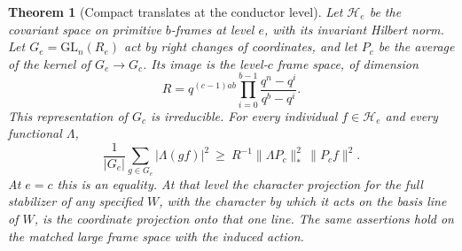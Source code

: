 \documentclass[a4paper,11pt]{article}
\newtheorem{theorem}[proposition]{Theorem}
\theoremstyle{definition}
\theoremstyle{remark}
\numberwithin{equation}{section}
\begin{document}
\begin{theorem}[Compact translates at the conductor level]\label{thm:compactrow335}
Let \(\mathcal H_e\) be the covariant space on primitive \(b\)-frames
at level \(e\), with its invariant Hilbert norm. Let
\(G_e=\mathrm{GL}_n(R_e)\) act by right changes of coordinates, and
let \(P_c\) be the average of the kernel of \(G_e\to G_c\). Its image
is the level-\(c\) frame space, of dimension
\[
         R=q^{(c-1)ab}\prod_{i=0}^{b-1}
                         \frac{q^n-q^i}{q^b-q^i}.
\]
This representation of \(G_c\) is irreducible. For every individual
\(f\in\mathcal H_e\) and every functional \(\Lambda\),
\[
 \frac1{|G_e|}\sum_{g\in G_e}|\Lambda(g f)|^2
       \ \ge\ R^{-1}\|\Lambda P_c\|_*^2\,\|P_cf\|^2 .
\]
At \(e=c\) this is an equality. At that level the character projection
for the full stabilizer of any specified \(W\), with the character by
which it acts on the basis line of \(W\), is the coordinate projection
onto that one line. The same assertions hold on the matched large
frame space with the induced action.
\end{theorem}
\end{document}
